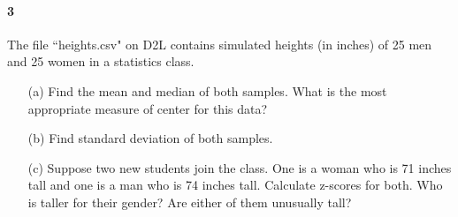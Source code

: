 \documentclass{article}
\begin{document}
\begin{flushleft}
\paragraph{3} The file ``heights.csv" on D2L contains simulated heights (in inches) of 25 men and 25 women in a statistics class. 
\begin{itemize}
\item [(a)] Find the mean and median of both samples. What is the most appropriate measure of center for this data?
\vspace{2.25in}
\item[(b)] Find standard deviation of both samples.
\vspace{2.25in}
\item[(c)] Suppose two new students join the class. One is a woman who is 71 inches tall and one is a man who is 74 inches tall. Calculate z-scores for both. Who is taller for their gender? Are either of them unusually tall?
\end{itemize}


\end{flushleft}
\end{document}
